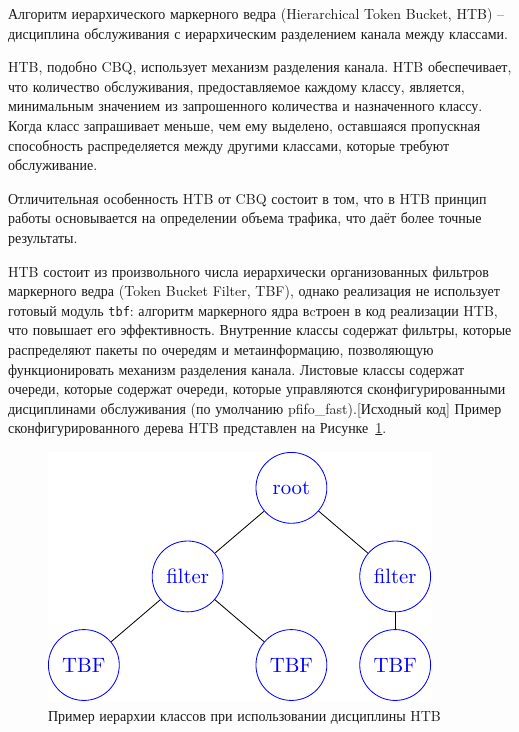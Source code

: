         Алгоритм иерархического маркерного ведра (Hierarchical Token Bucket, HTB) -- дисциплина
        обслуживания с иерархическим разделением канала между классами.

		HTB, подобно CBQ, использует механизм разделения канала. 
		HTB обеспечивает, что количество обслуживания, предоставляемое каждому классу, является,
		минимальным значением из запрошенного количества и назначенного классу. Когда класс
		запрашивает меньше, чем ему выделено, оставшаяся пропускная способность распределяется между
		другими классами, которые требуют обслуживание.\cite{htb}

		Отличительная особенность HTB от CBQ состоит в том, что в HTB принцип работы
		основывается на определении объема трафика\cite{lartc}, что даёт более точные результаты.

		HTB состоит из произвольного числа иерархически организованных фильтров маркерного
        ведра (Token Bucket Filter, TBF)\cite{packethandling}, однако реализация не использует готовый
		модуль \texttt{tbf}: алгоритм маркерного ядра вcтроен в код реализации HTB,	
		что повышает его эффективность. Внутренние классы содержат фильтры, которые
		распределяют пакеты по очередям и метаинформацию, позволяющую функционировать
		механизм разделения канала. Листовые классы содержат очереди, которые содержат
		очереди, которые управляются сконфигурированными дисциплинами обслуживания (по
		умолчанию pfifo\_fast).[Исходный код] Пример сконфигурированного дерева HTB
		представлен на Рисунке~\ref{pic:htb_hier}.
		
        \begin{figure}[ht!]
            \center
            \includegraphics[scale=1.4]{./pdfimages/class_hierh_htb.pdf}
            \caption{Пример иерархии классов при использовании дисциплины HTB}
			\label{pic:htb_hier}
        \end{figure}


